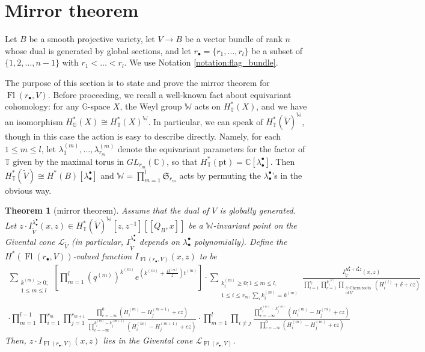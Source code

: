 \documentclass[a4paper,12pt]{amsart}
\numberwithin{equation}{section}
\newtheorem{theorem}{Theorem}[section]
\theoremstyle{definition}
\newcommand{\C}{\mathbb{C}}
\newcommand{\G}{\mathbb{G}}
\newcommand{\T}{\mathbb{T}}
\newcommand{\W}{\mathbb{W}}
\newcommand{\cL}{\mathcal{L}}
\newcommand{\Fl}{\operatorname{Fl}}
\begin{document}
\section{Mirror theorem}\label{sec:main_theorem}

Let $B$ be a smooth projective variety, let $V\to B$ be a vector bundle of rank $n$ whose dual is generated by global sections, and let $r_\bullet=\{r_1,\dots,r_l\}$ be a subset of $\{1,2,\dots,n-1\}$ with $r_1<\dots<r_l$.
We use Notation \ref{notation:flag_bundle}.

The purpose of this section is to state and prove the mirror theorem for $\Fl(r_\bullet,V)$.
Before proceeding, we recall a well-known fact about equivariant cohomology:
for any $\G$-space $X$, the Weyl group $\W$ acts on $H^*_\T(X)$, and we have an isomorphism $H_\G^*(X)\cong H_\T^*(X)^\W$. In particular, we can speak of $H^*_\T(\widetilde{V})^\W$, though in this case the action is easy to describe directly. Namely, for each $1\leq m\leq l$, let $\lambda_1^{(m)},\dots, \lambda_{r_m}^{(m)}$ denote the equivariant parameters for the factor of $\T$ given by the maximal torus in $GL_{r_m}(\C)$, so that $H^*_\T(\mathrm{pt})=\C[\lambda_{\bullet}^\bullet]$. Then $H^*_\T(\widetilde{V})\cong H^*(B)[\lambda_{\bullet}^\bullet]$ and $\W=\prod_{m=1}^l\mathfrak{S}_{r_m}$ acts by permuting the 
$\lambda_{\bullet}^\bullet$'s in the obvious way.

\begin{theorem}[mirror theorem]\label{thm:mirror_Fl}
    Assume that the dual of $V$ is globally generated.
    Let $z\cdot I^{\lambda_\bullet^\bullet}_{\widetilde{V}}(x,z) \in H^*_\T(\widetilde{V})^\W[z,z^{-1}][\![Q_B,x]\!]$ be a $\W$-invariant point on the Givental cone $\cL_{\widetilde{V}}$ (in particular, $I^{\lambda_\bullet^\bullet}_{\widetilde{V}}$ depends on $\lambda_\bullet^\bullet$ polynomially). 
    Define the $H^*(\Fl(r_\bullet,V))$-valued function $I_{\Fl(r_\bullet,V)}(x,z)$ to be
    \begin{multline*}
    \sum_{ \substack{k^{(m)}\geq0; \\1\leq m\leq l} } \left[ \prod_{m=1}^l (q^{(m)})^{k^{(m)}}e^{\left(k^{(m)}+\frac{H^{(m)}}{z}\right)t^{(m)}} \right] \cdot \sum_{ \substack{k_i^{(m)}\geq0; 1\leq m\leq l, \\ 1\leq i\leq r_m,\sum_ik_i^{(m)}=k^{(m)}} } \frac{ I^{H_\bullet^\bullet+k_\bullet^\bullet z}_{\widetilde{V}}(x,z) }{\prod_{i=1}^{r_l} \prod_{c=1}^{k_i^{(l)}} \prod_{ \substack{\delta\colon\mathrm{Chern\ roots} \\ \mathrm{of\ } V} } (H_i^{(l)} + \delta + cz)}	\\
    \cdot \prod_{m=1}^{l-1}\prod_{i=1}^{r_m}\prod_{j=1}^{r_{m+1}}\frac{\prod_{c=-\infty}^{0}(H_i^{(m)}-H_j^{(m+1)}+cz)}{\prod_{c=-\infty}^{k_i^{(m)}-k_j^{(m+1)}}(H_i^{(m)}-H_j^{(m+1)}+cz)}
    \cdot \prod_{m=1}^l\prod_{i\neq j}\frac{\prod_{c=-\infty}^{k_i^{(m)}-k_j^{(m)}}(H_i^{(m)}-H_j^{(m)}+cz)}{\prod_{c=-\infty}^{0}(H_i^{(m)}-H_j^{(m)}+cz)}
    \end{multline*}
    Then, $z\cdot I_{\Fl(r_\bullet,V)}(x,z)$ lies in the Givental cone $\cL_{\Fl(r_\bullet,V)}$.
\end{theorem}
\end{document}
